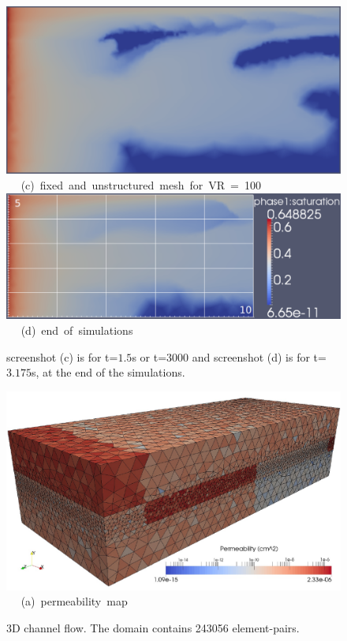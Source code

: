 \begin{landscape}
\begin{figure}[ht] 
\vbox{
\hbox{\hspace{3.5cm}
\includegraphics[width=.7\textwidth]{./Pics1/mr100_fixed/mr100_fixed_3000.pdf} 
}
\vspace{0.0cm}
\hbox{\hspace{3.75cm} (c) fixed and unstructured mesh for VR = 100    
}
\hbox{\hspace{3.5cm}
\includegraphics[width=.93\textwidth]{./Pics1/mr100_fixed/mr100_fixed_end.pdf}
}
\vspace{0.0cm}
\hbox{\hspace{7.cm} (d) end of simulations     
}
}     
\caption{screenshot (c) is for t=$1.5$s or t=$3000$ and screenshot (d) is for t=$3.175$s, at the end of the simulations. }
\label{fig:4testcase_b}
\end{figure}
\end{landscape}
\clearpage



\begin{figure}[ht]
\vbox{\vspace{-.5cm}
      \hbox{\includegraphics[width=\textwidth]{./Pics1/3D_Channel/Test_SlowNew_MeshPermeability.pdf} }
      \hbox{\hspace{5.0cm} (a) permeability map }}
\caption{3D channel flow. The domain contains 243056  element-pairs.}
\label{fig:3DChannel_PermMesh}
\end{figure}
\clearpage

